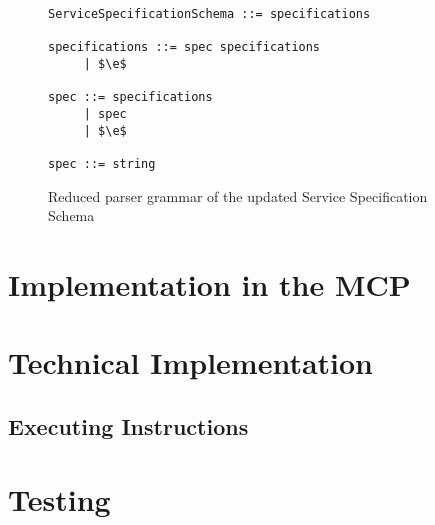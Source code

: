 \begin{figure}
	\centering
	\begin{lstlisting}[keywordstyle={}]
ServiceSpecificationSchema ::= specifications

specifications ::= spec specifications
     | $\e$
     
spec ::= specifications
     | spec
     | $\e$

spec ::= string
	\end{lstlisting}
	\caption{Reduced parser grammar of the updated Service Specification Schema}
	\label{fig:sSpecUpdRed}
\end{figure}

\section{Implementation in the MCP}

\section{Technical Implementation}

\subsection{Executing Instructions}

\section{Testing}

